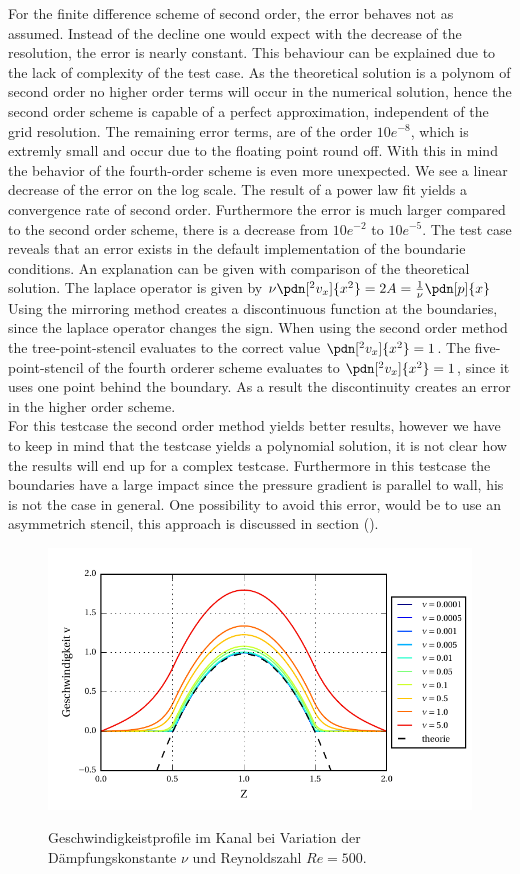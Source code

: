 For the finite difference scheme of second order, the error behaves not as assumed.
Instead of the decline one would expect with the decrease of the resolution, the  error is nearly constant.
This behaviour can be explained due to the lack of complexity of the test case.
 As the theoretical solution is a polynom of second order
no higher order terms will occur in the numerical solution, hence the
 second order scheme is capable of a perfect approximation, independent of the
grid resolution. The remaining error terms, are of the order $10e^{-8}$,
 which is extremly small and occur due to the floating point round off.
With this in mind the behavior of the fourth-order scheme is even more unexpected.
We see a linear decrease of the error on the log scale.
The result of a power law fit yields a convergence rate of second order.
Furthermore the error is much larger compared to the second order scheme,
 there is a decrease from $10e^{-2}$ to $10e^{-5}$.
The test case reveals that an error exists in the default implementation of the boundarie conditions.
An explanation can be given with comparison of the theoretical solution. The laplace operator is given by
 $ \nu \pdn[^2 v_x]{x^2} = 2A = \frac{1}{\nu}\pdn[p]{x}$
Using the mirroring method creates a discontinuous function at the boundaries, since the laplace operator changes the sign.
When using the second order method the tree-point-stencil evaluates to the correct value $\pdn[^2 v_x]{x^2} = 1$.
The five-point-stencil of the fourth orderer scheme evaluates to $\pdn[^2 v_x]{x^2} = 1$, since it uses one point behind the boundary.
As a result the discontinuity creates an error in the higher order scheme.\\
For this testcase the second order method yields better results, however we
have to keep in mind that the testcase yields a polynomial solution,
it is not clear how the results will end up for a complex testcase.
Furthermore in this testcase the boundaries have a large impact since the pressure gradient is parallel to wall,
his is not the case in general.
One possibility to avoid this error, would be to use an asymmetrich stencil, this approach is discussed in section ().

\begin{figure}[!b]
  \centering
  \includegraphics{gfx/immersed_boundary/poiseuille_flow/2_vp/vp_profile.pdf}\label{fig:vp_flow}
  \caption{Geschwindigkeistprofile im Kanal bei Variation der Dämpfungskonstante $\nu$ und Reynoldszahl $Re=500$.}
\end{figure}

